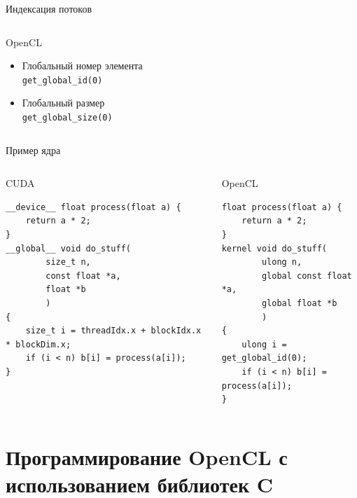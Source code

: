 \documentclass[@BEAMER_OPTIONS@]{beamer}
\newcommand{\code}[1]{\lstinline|#1|}
\newcommand{\CXX}{{\rm C}\plusplus}
\begin{document}
\begin{frame}[fragile]{Индексация потоков}
\begin{columns}
\begin{column}{0.48\textwidth}
\begin{block}{OpenCL}
\begin{itemize}
                        \code{get_local_id(0)}
                    \item<5-> Глобальный номер элемента \\
                        \code{get_global_id(0)}
                    \item<6-> Глобальный размер \\
                        \code{get_global_size(0)}
                \end{itemize}
            \end{block}
        \end{column}
    \end{columns}
\end{frame}

\begin{frame}[fragile]{Пример ядра}
    \begin{columns}
        \begin{column}{0.57\textwidth}
            \begin{exampleblock}{CUDA}
                \begin{lstlisting}
__device__ float process(float a) {
    return a * 2;
}
__global__ void do_stuff(
        size_t n,
        const float *a,
        float *b
        )
{
    size_t i = threadIdx.x + blockIdx.x * blockDim.x;
    if (i < n) b[i] = process(a[i]);
}
                \end{lstlisting}
            \end{exampleblock}
        \end{column}
        \begin{column}{0.37\textwidth}
            \begin{exampleblock}{OpenCL}
                \begin{lstlisting}
float process(float a) {
    return a * 2;
}
kernel void do_stuff(
        ulong n,
        global const float *a,
        global float *b
        )
{
    ulong i = get_global_id(0);
    if (i < n) b[i] = process(a[i]);
}
                \end{lstlisting}
            \end{exampleblock}
        \end{column}
    \end{columns}
\end{frame}

\section{Программирование OpenCL с использованием библиотек \CXX}
\begin{frame}
    \sectionpage
\end{frame}
\end{document}
